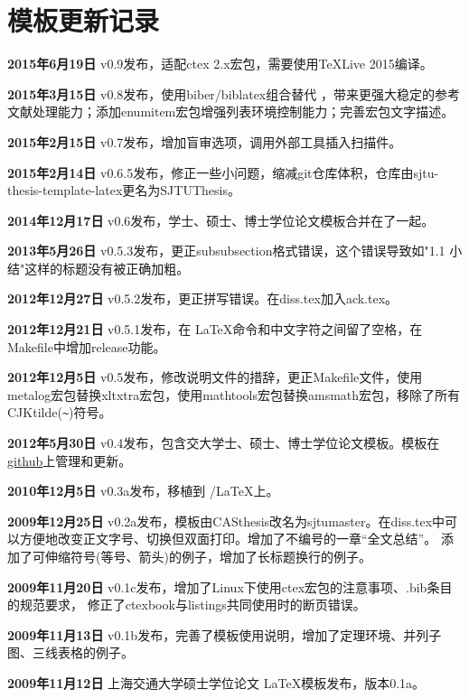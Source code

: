\chapter{模板更新记录}
\label{chap:updatelog}

\textbf{2015年6月19日} v0.9发布，适配ctex 2.x宏包，需要使用TeXLive 2015编译。

\textbf{2015年3月15日} v0.8发布，使用biber/biblatex组合替代 \BibTeX ，带来更强大稳定的参考文献处理能力；添加enumitem宏包增强列表环境控制能力；完善宏包文字描述。

\textbf{2015年2月15日} v0.7发布，增加盲审选项，调用外部工具插入扫描件。

\textbf{2015年2月14日} v0.6.5发布，修正一些小问题，缩减git仓库体积，仓库由sjtu-thesis-template-latex更名为SJTUThesis。

\textbf{2014年12月17日} v0.6发布，学士、硕士、博士学位论文模板合并在了一起。

\textbf{2013年5月26日} v0.5.3发布，更正subsubsection格式错误，这个错误导致如"1.1 小结"这样的标题没有被正确加粗。

\textbf{2012年12月27日} v0.5.2发布，更正拼写错误。在diss.tex加入ack.tex。

\textbf{2012年12月21日} v0.5.1发布，在 \LaTeX 命令和中文字符之间留了空格，在Makefile中增加release功能。

\textbf{2012年12月5日} v0.5发布，修改说明文件的措辞，更正Makefile文件，使用metalog宏包替换xltxtra宏包，使用mathtools宏包替换amsmath宏包，移除了所有CJKtilde(\verb+~+)符号。

\textbf{2012年5月30日} v0.4发布，包含交大学士、硕士、博士学位论文模板。模板在\href{https://github.com/weijianwen/sjtu-thesis-template-latex}{github}上管理和更新。

\textbf{2010年12月5日} v0.3a发布，移植到 \XeTeX/\LaTeX 上。

\textbf{2009年12月25日} v0.2a发布，模板由CASthesis改名为sjtumaster。在diss.tex中可以方便地改变正文字号、切换但双面打印。增加了不编号的一章“全文总结”。
添加了可伸缩符号(等号、箭头)的例子，增加了长标题换行的例子。

\textbf{2009年11月20日} v0.1c发布，增加了Linux下使用ctex宏包的注意事项、.bib条目的规范要求，
修正了ctexbook与listings共同使用时的断页错误。

\textbf{2009年11月13日} v0.1b发布，完善了模板使用说明，增加了定理环境、并列子图、三线表格的例子。

\textbf{2009年11月12日} 上海交通大学硕士学位论文 \LaTeX 模板发布，版本0.1a。

